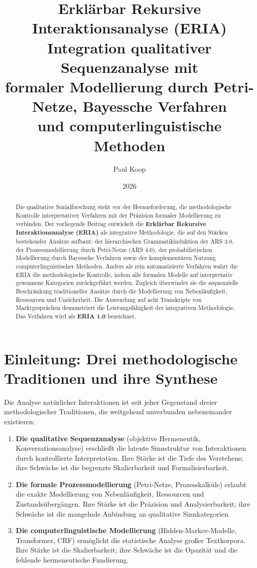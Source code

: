 \documentclass[12pt,a4paper]{article}
\title{\Huge\textbf{Erklärbar Rekursive Interaktionsanalyse (ERIA)} \\
       \LARGE Integration qualitativer Sequenzanalyse mit\\
       \LARGE formaler Modellierung durch Petri-Netze, Bayessche Verfahren\\
       \LARGE und computerlinguistische Methoden}
\author{
  \large
  \begin{tabular}{c}
    Paul Koop
  \end{tabular}
}
\date{\large 2026}
\begin{document}
\maketitle

\begin{abstract}
Die qualitative Sozialforschung steht vor der Herausforderung, die methodologische 
Kontrolle interpretativer Verfahren mit der Präzision formaler Modellierung zu 
verbinden. Der vorliegende Beitrag entwickelt die \textbf{Erklärbar Rekursive 
Interaktionsanalyse (ERIA)} als integrative Methodologie, die auf den Stärken 
bestehender Ansätze aufbaut: der hierarchischen Grammatikinduktion der ARS 3.0, 
der Prozessmodellierung durch Petri-Netze (ARS 4.0), der probabilistischen Modellierung 
durch Bayessche Verfahren sowie der komplementären Nutzung computerlinguistischer 
Methoden. Anders als rein automatisierte Verfahren wahrt die ERIA die methodologische 
Kontrolle, indem alle formalen Modelle auf interpretativ gewonnene Kategorien 
zurückgeführt werden. Zugleich überwindet sie die sequenzielle Beschränkung 
traditioneller Ansätze durch die Modellierung von Nebenläufigkeit, Ressourcen und 
Unsicherheit. Die Anwendung auf acht Transkripte von Marktgesprächen demonstriert 
die Leistungsfähigkeit der integrativen Methodologie. Das Verfahren wird als 
\textbf{ERIA 1.0} bezeichnet.
\end{abstract}

\newpage
\tableofcontents
\newpage

\section{Einleitung: Drei methodologische Traditionen und ihre Synthese}

Die Analyse natürlicher Interaktionen ist seit jeher Gegenstand dreier methodologischer 
Traditionen, die weitgehend unverbunden nebeneinander existieren:

\begin{enumerate}
    \item \textbf{Die qualitative Sequenzanalyse} (objektive Hermeneutik, 
    Konversationsanalyse) erschließt die latente Sinnstruktur von Interaktionen 
    durch kontrollierte Interpretation. Ihre Stärke ist die Tiefe des Verstehens; 
    ihre Schwäche ist die begrenzte Skalierbarkeit und Formalisierbarkeit.
    
    \item \textbf{Die formale Prozessmodellierung} (Petri-Netze, Prozesskalküle) 
    erlaubt die exakte Modellierung von Nebenläufigkeit, Ressourcen und Zustandsübergängen. 
    Ihre Stärke ist die Präzision und Analysierbarkeit; ihre Schwäche ist die 
    mangelnde Anbindung an qualitative Sinnkategorien.
    
    \item \textbf{Die computerlinguistische Modellierung} (Hidden-Markov-Modelle, 
    Transformer, CRF) ermöglicht die statistische Analyse großer Textkorpora. 
    Ihre Stärke ist die Skalierbarkeit; ihre Schwäche ist die Opazität und die 
    fehlende hermeneutische Fundierung.
\end{enumerate}
\end{document}
